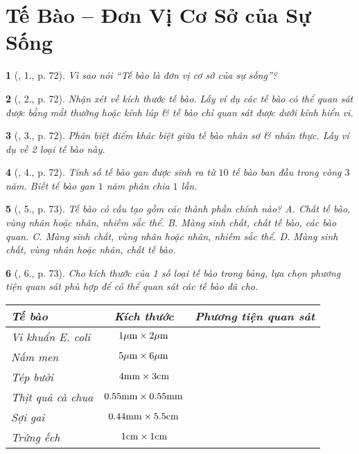 \documentclass{article}
\newtheorem{baitoan}{}
\begin{document}

\section{Tế Bào -- Đơn Vị Cơ Sở của Sự Sống}

\begin{baitoan}[\cite{ncpt_KHTN_6_tap_1}, 1., p. 72]
	Vì sao nói ``Tế bào là đơn vị cơ sở của sự sống''?
\end{baitoan}

\begin{baitoan}[\cite{ncpt_KHTN_6_tap_1}, 2., p. 72]
	Nhận xét về kích thước tế bào. Lấy ví dụ các tế bào có thể quan sát được bằng mắt thường hoặc kính lúp \& tế bào chỉ quan sát được dưới kính hiển vi.
\end{baitoan}

\begin{baitoan}[\cite{ncpt_KHTN_6_tap_1}, 3., p. 72]
	Phân biệt điểm khác biệt giữa tế bào nhân sơ \& nhân thực. Lấy ví dụ về 2 loại tế bào này.
\end{baitoan}

\begin{baitoan}[\cite{ncpt_KHTN_6_tap_1}, 4., p. 72]
	Tính số tế bào gan được sinh ra từ $10$ tế bào ban đầu trong vòng $3$ năm. Biết tế bào gan $1$ năm phân chia $1$ lần.
\end{baitoan}

\begin{baitoan}[\cite{ncpt_KHTN_6_tap_1}, 5., p. 73]
	Tế bào có cấu tạo gồm các thành phần chính nào? {\sf A.} Chất tế bào, vùng nhân hoặc nhân, nhiễm sắc thể. {\sf B.} Màng sinh chất, chất tế bào, các bào quan. {\sf C.} Màng sinh chất, vùng nhân hoặc nhân, nhiễm sắc thể. {\sf D.} Màng sinh chất, vùng nhân hoặc nhân, chất tế bào.
\end{baitoan}

\begin{baitoan}[\cite{ncpt_KHTN_6_tap_1}, 6., p. 73]
	Cho kích thước của 1 số loại tế bào trong bảng, lựa chọn phương tiện quan sát phù hợp để có thể quan sát các tế bào đã cho.
	\begin{table}[H]
		\centering
		\begin{tabular}{|l|c|c|}
			\hline
			Tế bào & Kích thước  & Phương tiện quan sát \\
			\hline
			Vi khuẩn E. coli & $\rm1\mu m\times2\mu m$ &  \\
			\hline
			Nấm men & $\rm5\mu m\times6\mu m$ &  \\
			\hline
			Tép bưởi & $\rm4mm\times3cm$ &  \\
			\hline
			Thịt quả cà chua & $\rm0.55mm\times0.55mm$ &  \\
			\hline
			Sợi gai & $\rm0.44mm\times5.5cm$ &  \\
			\hline
			Trứng ếch & $\rm1cm\times1cm$ &  \\
			\hline
		\end{tabular}
	\end{table}
\end{baitoan}
\end{document}
